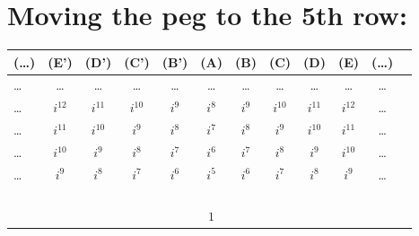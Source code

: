 \documentclass[12pt]{article}
\begin{document}
    
    
    
    
        
\section{Moving the peg to the 5th row:}
    \begin{tabular}{|l|c|c|c|c|c|c|c|c|c|c|r|}
        (\dots) & (E') & (D') & (C') & (B') & (A) & (B) & (C) & (D) & (E) & (\dots)\\
        \hline
        \dots & \dots & \dots & \dots & \dots & \dots & \dots & \dots & \dots & \dots & \dots \\
            
        \hline
        \dots & $i^{12}$ & $i^{11}$ & $i^{10}$ & $i^9$ & $i^8$ & $i^9$ & $i^{10}$ & $i^{11}$ & $i^{12}$ & \dots\\
            
        \hline
        \dots & $i^{11}$ & $i^{10}$ & $i^9$ & $i^8$ & $i^7$ & $i^8$ & $i^9$ & $i^{10}$ & $i^{11}$ & \dots\\
            
        \hline
        \dots & $i^{10}$ & $i^9$ & $i^8$ & $i^7$ & $i^6$ & $i^7$ & $i^8$ & $i^9$ & $i^{10}$ & \dots\\
            
        \hline
        \dots & $i^9$ & $i^8$ & $i^7$ & $i^6$ & $i^5$ & $i^6$ & $i^7$ & $i^8$ & $i^9$ & \dots\\
            
        \hline
        & & & & & & & & & &\\
        \hline
        & & & & & & & & & &\\
        \hline
        & & & & & & & & & &\\
        \hline
        & & & & & & & & & &\\
        \hline
        & & & & & $1$ & & & & &\\
        \hline
    \end{tabular}
\end{document}
